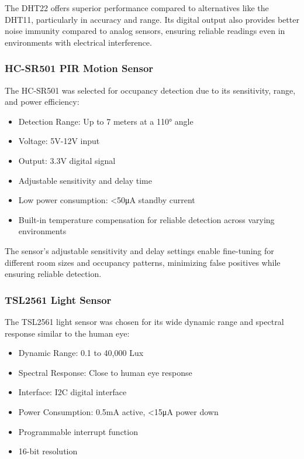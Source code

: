 \documentclass[a4paper]{scrartcl}
\begin{document}
    The DHT22 offers superior performance compared to alternatives like the DHT11, particularly in accuracy and range. Its digital output also provides better noise immunity compared to analog sensors, ensuring reliable readings even in environments with electrical interference.
    
    \subsubsection{HC-SR501 PIR Motion Sensor}
    The HC-SR501 was selected for occupancy detection due to its sensitivity, range, and power efficiency:
    \begin{itemize}
        \item Detection Range: Up to 7 meters at a 110° angle
        \item Voltage: 5V-12V input
        \item Output: 3.3V digital signal
        \item Adjustable sensitivity and delay time
        \item Low power consumption: <50μA standby current
        \item Built-in temperature compensation for reliable detection across varying environments
    \end{itemize}
    
    The sensor's adjustable sensitivity and delay settings enable fine-tuning for different room sizes and occupancy patterns, minimizing false positives while ensuring reliable detection.
    
    \subsubsection{TSL2561 Light Sensor}
    The TSL2561 light sensor was chosen for its wide dynamic range and spectral response similar to the human eye:
    \begin{itemize}
        \item Dynamic Range: 0.1 to 40,000 Lux
        \item Spectral Response: Close to human eye response
        \item Interface: I2C digital interface
        \item Power Consumption: 0.5mA active, <15μA power down
        \item Programmable interrupt function
        \item 16-bit resolution
    \end{itemize}
    
\end{document}
